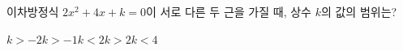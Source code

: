 이차방정식 $2x^2+4x+k=0$이 서로 다른 두 근을 가질 때, 상수 $k$의 값의 범위는?
\begin{choices32}{$k>-2$}{$k>-1$}{$k<2$}{$k>2$}{$k<4$}\end{choices32}
